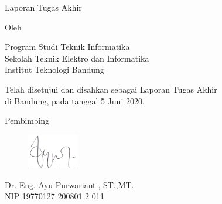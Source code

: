 \clearpage
\pagestyle{empty}
\begin{center}
\smallskip

    \Large \bfseries \MakeUppercase{\thetitle}
    \vfill

    \Large Laporan Tugas Akhir
    \vfill

    \large Oleh

    \Large \theauthor

    \large Program Studi Teknik Informatika \\
    \normalsize \normalfont Sekolah Teknik Elektro dan Informatika \\
    Institut Teknologi Bandung \\

    \vfill
    \normalsize \normalfont{
        
    }
    
    Telah disetujui dan disahkan sebagai Laporan Tugas Akhir \\
    di Bandung, pada tanggal 5 Juni 2020.

    \vfill
    \normalsize \normalfont
    Pembimbing\\
    \begin{figure}[!h]
        \centering
        \includegraphics[width=0.2\textwidth]{resources/tandatangan_bu_ayu.png}
    \end{figure}
    \underline{Dr. Eng. Ayu Purwarianti, ST.,MT.} \\
    NIP 19770127 200801 2 011


\end{center}
\restoregeometry
\clearpage
